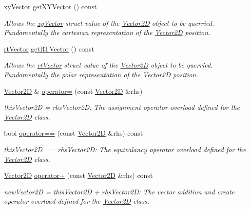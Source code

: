 \begin{DoxyCompactItemize}
\hyperlink{structxy_vector}{xy\+Vector} \hyperlink{class_vector2_d_a4bc415751c246ae44727ef4f6b80d80c}{get\+X\+Y\+Vector} () const
\begin{DoxyCompactList}\small\item\em Allows the \hyperlink{structxy_vector}{xy\+Vector} struct value of the \hyperlink{class_vector2_d}{Vector2D} object to be querried. Fundamentally the cartesian representation of the \hyperlink{class_vector2_d}{Vector2D} position. \end{DoxyCompactList}\item 
\hyperlink{structrt_vector}{rt\+Vector} \hyperlink{class_vector2_d_a2760dd54ac65996966d1b9077cbecb06}{get\+R\+T\+Vector} () const
\begin{DoxyCompactList}\small\item\em Allows the \hyperlink{structrt_vector}{rt\+Vector} struct value of the \hyperlink{class_vector2_d}{Vector2D} object to be querried. Fundamentally the polar representation of the \hyperlink{class_vector2_d}{Vector2D} position. \end{DoxyCompactList}\item 
\hyperlink{class_vector2_d}{Vector2D} \& \hyperlink{class_vector2_d_abfa56cdcf167527e7c5efd54c4c1bffe}{operator=} (const \hyperlink{class_vector2_d}{Vector2D} \&rhs)
\begin{DoxyCompactList}\small\item\em this\+Vector2D = rhs\+Vector2D\+: The assignment operator overload defined for the \hyperlink{class_vector2_d}{Vector2D} class. \end{DoxyCompactList}\item 
bool \hyperlink{class_vector2_d_a41f425fcd08fb82c7e72e132fb51136f}{operator==} (const \hyperlink{class_vector2_d}{Vector2D} \&rhs) const
\begin{DoxyCompactList}\small\item\em this\+Vector2D == rhs\+Vector2D\+: The equivalancy operator overload defined for the \hyperlink{class_vector2_d}{Vector2D} class. \end{DoxyCompactList}\item 
\hyperlink{class_vector2_d}{Vector2D} \hyperlink{class_vector2_d_a142a352f6cb2406fee15d153a275439c}{operator+} (const \hyperlink{class_vector2_d}{Vector2D} \&rhs) const
\begin{DoxyCompactList}\small\item\em new\+Vector2D = this\+Vector2D + rhs\+Vector2D\+: The vector addition and create operator overload defined for the \hyperlink{class_vector2_d}{Vector2D} class. \end{DoxyCompactList}\item 

\end{DoxyCompactItemize}
